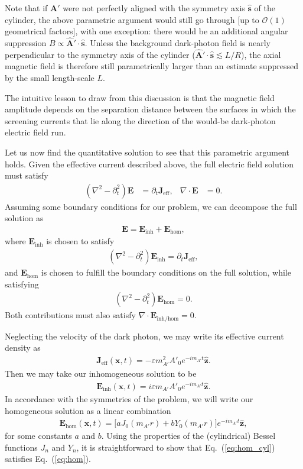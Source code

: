 \documentclass[amsmath,amssymb,aps,10pt,prd,letterpaper,nofootinbib,balancelastpage,notitlepage,superscriptaddress,twocolumn,floatfix]{revtex4-2}
\renewcommand{\eqref}[2][]{Eq{#1}.~(\ref{eq:#2})}	%
\newcommand{\zhat}{\bm{\hat{z}}}
\begin{document}
Note that if $\bm{A}'$ were not perfectly aligned with the symmetry axis $\bm{\hat{s}}$ of the cylinder, the above parametric argument would still go through [up to $\mathcal{O}(1)$ geometrical factors], with one exception: there would be an additional angular suppression $B \propto \bm{\hat{A}}'\cdot \bm{\hat{s}}$.
Unless the background dark-photon field is nearly perpendicular to the symmetry axis of the cylinder ($\bm{\hat{A}}'\cdot \bm{\hat{s}} \lesssim L/R$), the axial magnetic field is therefore still parametrically larger than an estimate suppressed by the small length-scale $L$.

The intuitive lesson to draw from this discussion is that the magnetic field amplitude depends on the separation distance between the surfaces in which the screening currents that lie along the direction of the would-be dark-photon electric field run.

Let us now find the quantitative solution to see that this parametric argument holds.
Given the effective current described above, the full electric field solution must satisfy
\begin{align}
    (\nabla^2-\partial_t^2)\bm{E}&=\partial_t\bm{J}_\text{eff},&\nabla\cdot\bm{E}&=0.
\end{align}
Assuming some boundary conditions for our problem, we can decompose the full solution as
\begin{align}
    \bm{E}=\bm{E}_\text{inh}+\bm{E}_\text{hom},
\end{align}
where $\bm{E}_\text{inh}$ is chosen to satisfy
\begin{align}
    (\nabla^2-\partial_t^2)\bm{E}_\text{inh}=\partial_t\bm{J}_\text{eff},
\end{align}
and $\bm{E}_\text{hom}$ is chosen to fulfill the boundary conditions on the full solution, while satisfying
\begin{align}
    (\nabla^2-\partial_t^2)\bm{E}_\text{hom}=0.
    \label{eq:hom}
\end{align}
Both contributions must also satisfy $\nabla\cdot\bm{E}_\text{inh/hom}=0$.

Neglecting the velocity of the dark photon, we may write its effective current density as
\begin{align}
    \bm{J}_\text{eff}(\bm{x},t)=-\varepsilon m_{A'}^2A'_0e^{-im_{A'}t}\zhat.
\end{align}
Then we may take our inhomogeneous solution to be
\begin{align}
    \bm{E}_\text{inh}(\bm{x},t)=i\varepsilon m_{A'}A'_0e^{-im_{A'}t}\zhat.
    \label{eq:inh}
\end{align}
In accordance with the symmetries of the problem, we will write our homogeneous solution as a linear combination
\begin{align}
    \bm{E}_\text{hom}(\bm{x},t)=\big[aJ_0(m_{A'}r)+bY_0(m_{A'}r)\big]e^{-im_{A'}t}\zhat,
    \label{eq:hom_cyl}
\end{align}
for some constants $a$ and $b$.
Using the properties of the (cylindrical) Bessel functions $J_n$ and $Y_n$, it is straightforward to show that \eqref{hom_cyl} satisfies \eqref{hom}.
\end{document}
